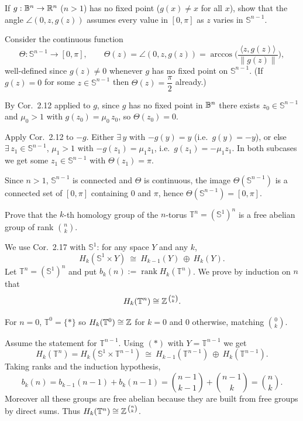 \bigskip

\begin{exercise}[2.13.2]
If $g:\mathbb{B}^n\to\Bbb R^n$ ($n>1$) has no fixed point ($g(x)\ne x$ for all $x$), show that
the angle $\angle(0,z,g(z))$ assumes every value in $[0,\pi]$ as $z$ varies in $\mathbb{S}^{n-1}$.
\end{exercise}

\begin{solution}
Consider the continuous function
\[
\Theta:\mathbb{S}^{n-1}\longrightarrow [0,\pi],\qquad
\Theta(z)=\angle(0,z,g(z))=\arccos\!\Big(\dfrac{\langle z,g(z)\rangle}{\|g(z)\|}\Big),
\]
well-defined since $g(z)\ne 0$ whenever $g$ has no fixed point on $\mathbb{S}^{n-1}$.
(If $g(z)=0$ for some $z\in \mathbb{S}^{n-1}$ then $\Theta(z)=\dfrac\pi2$ already.)

By Cor.\ 2.12 applied to $g$, since $g$ has no fixed point in $\mathbb{B}^n$ there exists
$z_0\in \mathbb{S}^{n-1}$ and $\mu_0>1$ with $g(z_0)=\mu_0\,z_0$, so $\Theta(z_0)=0$.

Apply Cor.\ 2.12 to $-g$.
Either $\exists\,y$ with $-g(y)=y$ (i.e.\ $g(y)=-y$), or else
$\exists\,z_1\in \mathbb{S}^{n-1}$, $\mu_1>1$ with $-g(z_1)=\mu_1 z_1$, i.e.\ $g(z_1)=-\mu_1 z_1$.
In both subcases we get some $z_1\in \mathbb{S}^{n-1}$ with $\Theta(z_1)=\pi$.

Since $n>1$, $\mathbb{S}^{n-1}$ is connected and $\Theta$ is continuous, the image
$\Theta(\mathbb{S}^{n-1})$ is a connected set of $[0,\pi]$ containing $0$ and $\pi$, hence
$\Theta(\mathbb{S}^{n-1})=[0,\pi]$.
\end{solution}

\bigskip

\begin{exercise}[2.13.3]
Prove that the $k$-th homology group of the $n$-torus
$\mathbb{T}^n=(\mathbb{S}^1)^n$ is a free abelian group of rank $\binom{n}{k}$.
\end{exercise}

\begin{solution}
We use Cor.\ 2.17 with $\mathbb{S}^1$:
for any space $Y$ and any $k$,
\[
H_k(\mathbb{S}^1\times Y)\ \cong\ H_{k-1}(Y)\ \oplus\ H_k(Y).
\tag{$\ast$}
\]
Let $\mathbb{T}^n=(\mathbb{S}^1)^n$ and put $b_k(n):=\operatorname{rank} H_k(\mathbb{T}^n)$.
We prove by induction on $n$ that \[H_k(\mathbb{T}^n)\cong \Bbb Z^{\,\binom{n}{k}}.\]

For $n=0$, $\mathbb{T}^0=\{\ast\}$ so $H_k(\mathbb{T}^0)\cong \Bbb Z$ for $k=0$ and $0$ otherwise,
matching $\binom{0}{k}$.

Assume the statement for $\mathbb{T}^{n-1}$. Using $(\ast)$ with $Y=\mathbb{T}^{n-1}$ we get
\[
H_k(\mathbb{T}^n)=H_k(\mathbb{S}^1\times \mathbb{T}^{n-1})
\ \cong\ H_{k-1}(\mathbb{T}^{n-1})\ \oplus\ H_k(\mathbb{T}^{n-1}).
\]
Taking ranks and the induction hypothesis,
\[
b_k(n)=b_{k-1}(n-1)+b_k(n-1)
=\binom{n-1}{k-1}+\binom{n-1}{k}=\binom{n}{k}.
\]
Moreover all these groups are free abelian because they are built from free groups
by direct sums. Thus $H_k(\mathbb{T}^n)\cong \Bbb Z^{\,\binom{n}{k}}$.
\end{solution}

